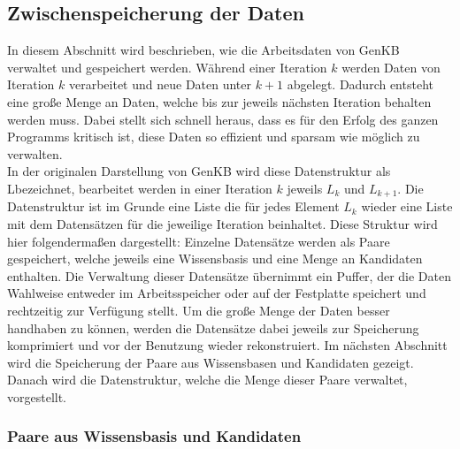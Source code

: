 \documentclass[12pt,a4paper]{article}
\begin{document}
\subsection{Zwischenspeicherung der Daten}
\label{sec:buffer}

In diesem Abschnitt wird beschrieben, wie die Arbeitsdaten von GenKB verwaltet und gespeichert werden. Während einer Iteration $k$ werden Daten von Iteration $k$ verarbeitet und neue Daten unter $k + 1$ abgelegt. Dadurch entsteht eine große Menge an Daten, welche bis zur jeweils nächsten Iteration behalten werden muss. Dabei stellt sich schnell heraus, dass es für den Erfolg des ganzen Programms kritisch ist, diese Daten so effizient und sparsam wie möglich zu verwalten. \\
In der originalen Darstellung von GenKB wird diese Datenstruktur als \glqq L\grqq \space bezeichnet, bearbeitet werden in einer Iteration $k$ jeweils $L_k$ und  $L_{k+1}$. Die Datenstruktur ist im Grunde eine Liste die für jedes Element $L_k$ wieder eine Liste mit dem Datensätzen für die jeweilige Iteration beinhaltet. Diese Struktur wird hier folgendermaßen dargestellt: Einzelne Datensätze werden als Paare gespeichert, welche jeweils eine Wissensbasis und eine Menge an Kandidaten enthalten. Die Verwaltung dieser Datensätze übernimmt ein Puffer, der die Daten Wahlweise entweder im Arbeitsspeicher oder auf der Festplatte speichert und rechtzeitig zur Verfügung stellt. Um die große Menge der Daten besser handhaben zu können, werden die Datensätze dabei jeweils zur Speicherung komprimiert und vor der Benutzung wieder rekonstruiert. Im nächsten Abschnitt wird die Speicherung der Paare aus Wissensbasen und Kandidaten gezeigt. Danach wird die Datenstruktur, welche die Menge dieser Paare verwaltet, vorgestellt.

\subsubsection{Paare aus Wissensbasis und Kandidaten}
\end{document}
